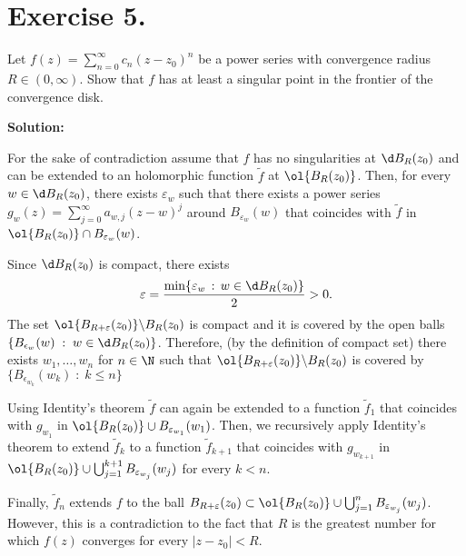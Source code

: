 
\section*{Exercise 5.}
Let $f(z) = \sum_{n = 0}^{\infty} c_n (z-z_0)^n$ be a power series with convergence radius $R \in (0,\infty)$. Show that $f$ has at least a singular point in the frontier of the convergence disk.

\textbf{Solution:}

For the sake of contradiction assume that $f$ has no singularities at $\d B_R(z_0)$ and can be extended to an holomorphic function $\tilde{f}$ at $\ol{B_R(z_0)}$. Then, for every $w\in \d B_R(z_0)$, there exists $\varepsilon_w$ such that there exists a power series $g_w(z) = \sum_{j = 0}^{\infty} a_{w,j} (z-w)^j$ around $B_{\varepsilon_w}(w)$ that coincides with $\tilde{f}$ in $\ol{B_R(z_0)} \cap B_{\varepsilon_w}(w)$. 

Since $\d B_R(z_0)$ is compact, there exists
\[ \varepsilon = \frac{\min \{\varepsilon_w \,:\, w\in \d B_R(z_0)\}}{2} > 0. \]
The set $\ol{B_{R+\varepsilon}(z_0)} \backslash B_R(z_0)$ is compact and it is covered by the open balls $\{B_{\epsilon_w}(w) \;:\; w \in \d B_R(z_0)\}$. Therefore, (by the definition of compact set) there exists $w_1,\ldots, w_n$ for $n \in \N$ such that $\ol{B_{R+\varepsilon}(z_0)} \backslash B_R(z_0)$ is covered by $\{B_{\epsilon_{w_k}}(w_k) \;:\; k \leq n\}$

Using Identity's theorem $\tilde{f}$ can again be extended to a function $\tilde{f}_1$ that coincides with $g_{w_1}$ in $\ol{B_R(z_0)} \cup B_{\varepsilon_{w_1}}(w_1)$. Then, we recursively apply Identity's theorem to extend $\tilde{f}_k$ to a function $\tilde{f}_{k+1}$ that coincides with $g_{w_{k+1}}$ in $\ol{B_R(z_0)} \cup \bigcup_{j = 1}^{k+1} B_{\varepsilon_{w_j}}(w_j)$ for every $k < n$.

Finally, $\tilde{f}_n$ extends $f$ to the ball $B_{R+\varepsilon}(z_0) \subset \ol{B_R(z_0)} \cup \bigcup_{j = 1}^{n} B_{\varepsilon_{w_j}}(w_j)$. However, this is a contradiction to the fact that $R$ is the greatest number for which $f(z)$ converges for every $|z-z_0| < R$.